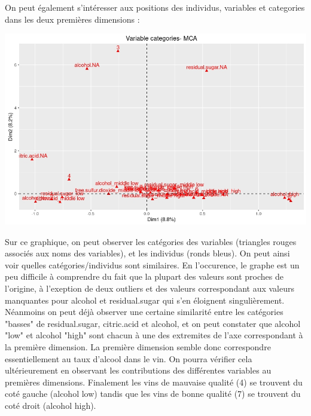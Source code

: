 \documentclass[11pt,a4paper]{article}
\begin{document}
On peut également s'intéresser aux positions des individus, variables et categories dans les deux premières dimensions :

\begin{center}
\includegraphics[scale=0.6]{"biplot-mca"}
\end{center}

Sur ce graphique, on peut observer les catégories des variables (triangles rouges associés aux noms des variables), et les individus (ronds bleus). On peut ainsi voir quelles catégories/individus sont similaires. En l'occurence, le graphe est un peu difficile à comprendre du fait que la plupart des valeurs sont proches de l'origine, à l'exeption de deux outliers et des valeurs correspondant aux valeurs manquantes pour alcohol et residual.sugar qui s'en éloignent singulièrement. Néanmoins on peut déjà observer une certaine similarité entre les catégories "basses" de residual.sugar, citric.acid et alcohol, et on peut constater que alcohol "low" et alcohol "high" sont chacun à une des extremites de l'axe correspondant à la première dimension. La première dimension semble donc correspondre essentiellement au taux d'alcool dans le vin. On pourra vérifier cela ultérieurement en observant les contributions des différentes variables au premières dimensions. Finalement les vins de mauvaise qualité (4) se trouvent du coté gauche (alcohol low) tandis que les vins de bonne qualité (7) se trouvent du coté droit (alcohol high). \bigskip
\end{document}
